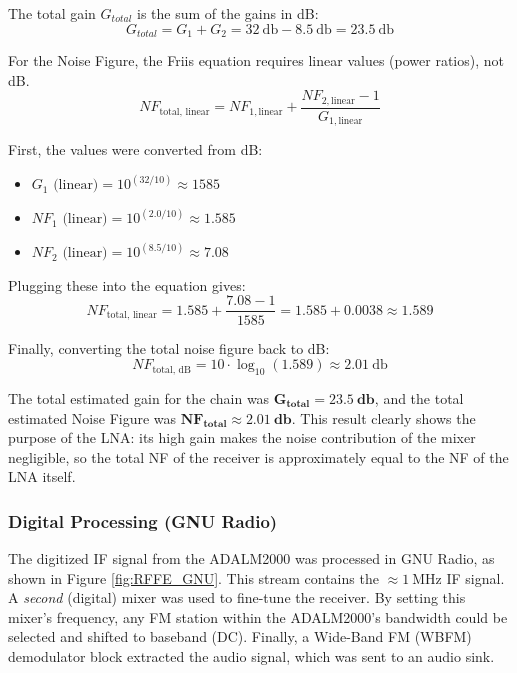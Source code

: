 The total gain $G_{total}$ is the sum of the gains in dB:
\begin{equation}
    G_{total} = G_1 + G_2 = \SI{32}{\decibel} - \SI{8.5}{\decibel} = \SI{23.5}{\decibel}
\end{equation}

For the Noise Figure, the Friis equation requires linear values (power ratios), not dB.
\begin{equation}
    NF_{\text{total, linear}} = NF_{1, \text{linear}} + \frac{NF_{2, \text{linear}} - 1}{G_{1, \text{linear}}}
\end{equation}

First, the values were converted from dB:
\begin{itemize}
    \item $G_1 \text{ (linear)} = 10^{(32 / 10)} \approx 1585$
    \item $NF_1 \text{ (linear)} = 10^{(2.0 / 10)} \approx 1.585$
    \item $NF_2 \text{ (linear)} = 10^{(8.5 / 10)} \approx 7.08$
\end{itemize}

Plugging these into the equation gives:
\begin{equation}
    NF_{\text{total, linear}} = 1.585 + \frac{7.08 - 1}{1585} = 1.585 + 0.0038 \approx 1.589
\end{equation}

Finally, converting the total noise figure back to dB:
\begin{equation}
    NF_{\text{total, dB}} = 10 \cdot \log_{10}(1.589) \approx \SI{2.01}{\decibel}
\end{equation}

The total estimated gain for the chain was $\mathbf{G_{total} = \SI{23.5}{\decibel}}$, and the total estimated Noise Figure was $\mathbf{NF_{total} \approx \SI{2.01}{\decibel}}$. This result clearly shows the purpose of the LNA: its high gain makes the noise contribution of the mixer negligible, so the total NF of the receiver is approximately equal to the NF of the LNA itself.

\subsubsection{Digital Processing (GNU Radio)}
The digitized IF signal from the ADALM2000 was processed in GNU Radio, as shown in Figure \ref{fig:RFFE_GNU}. This stream contains the $\approx \SI{1}{\mega\hertz}$ IF signal. A \textit{second} (digital) mixer was used to fine-tune the receiver. By setting this mixer's frequency, any FM station within the ADALM2000's bandwidth could be selected and shifted to baseband (DC). Finally, a Wide-Band FM (WBFM) demodulator block extracted the audio signal, which was sent to an audio sink.


